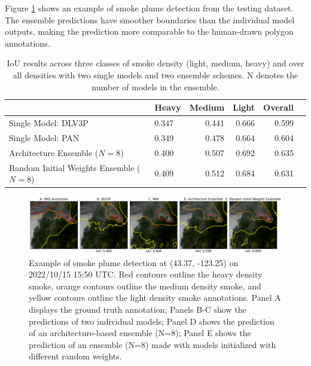\documentclass{article}
\begin{document}
Figure \ref{fig:ensemble_panel} shows an example of smoke plume detection from the testing dataset. The ensemble predictions have smoother boundaries than the individual model outputs, making the prediction more comparable to the human-drawn polygon annotations.
\begin{table}[h]
    \centering
    \caption{IoU results across three classes of smoke density (light, medium, heavy) and over all densities with two single models and two ensemble schemes. N denotes the number of models in the ensemble.}
    \label{tab:results}
    \begin{tabular}{llrrr>{\bfseries}r}
        \hline
            &   Heavy &   Medium &   Light &   Overall \\
        \hline
        Single Model: DLV3P \citep{dlv3p} &   0.347 &     0.441 &  0.666 &      0.599  \\
        Single Model: PAN \citep{PAN} &  0.349 &     0.478 &  0.664 &      0.604 \\
        Architecture Ensemble ($N=8$) &   0.400 &     0.507 &  0.692 &      0.635 \\
        Random Initial Weights Ensemble ($N=8$) &  0.409 &     0.512 &  0.684 &      0.631 \\
         \hline
    \end{tabular}
    \end{table}

\begin{figure}[h]
    \centering
    \includegraphics[width=\textwidth]{ensemble_panel_tinypaper.png}
    \caption{Example of smoke plume detection at (43.37, -123.25) on 2022/10/15 15:50 UTC. Red contours outline the heavy density smoke, orange contours outline the medium density smoke, and yellow contours outline the light density smoke annotations. Panel A displays the ground truth annotation; Panels B-C show the predictions of two individual models; Panel D shows the prediction of an architecture-based ensemble (N=8); Panel E shows the prediction of an ensemble (N=8) made with models initialized with different random weights.}
    \label{fig:ensemble_panel}
\end{figure}
\end{document}
